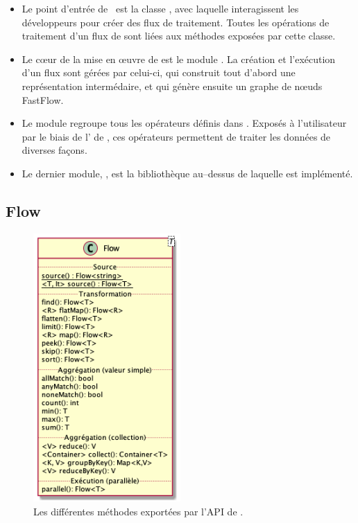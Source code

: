 \begin{itemize}

\item Le point d'entr\'ee de \ppff\ est la classe , avec laquelle interagissent les d\'eveloppeurs pour cr\'eer des flux de traitement. Toutes les op\'erations de traitement d'un flux de  sont li\'ees aux m\'ethodes expos\'ees par cette classe. 

\item Le c\oe{}ur de la mise en \oe{}uvre de  est le module . La cr\'eation et l'ex\'ecution d'un flux sont g\'er\'ees par celui-ci, qui construit tout d'abord une représentation intermédaire, et qui génère ensuite un graphe de n\oe{}uds FastFlow.

\item  Le module  regroupe tous les op\'erateurs d\'efinis dans . Expos\'es \`a l'utilisateur par le biais de l' de , ces op\'erateurs permettent de traiter les donn\'ees de diverses façons.

\item Le dernier module, , est la biblioth\`eque au–dessus de laquelle  est impl\'ement\'e.


\end{itemize}

\subsection{Flow}

\begin{figure}
\centering
     \includegraphics[width=0.5\textwidth]{Figures/flow-details.png}
      \caption{Les diff\'erentes m\'ethodes export\'ees par l'API de .}
       \label{Flow.fig}
\end{figure}



